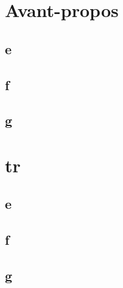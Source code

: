 \documentclass[a4paper,french,final]{memoir}
\begin{document}
\begin{titlingpage}
\hypersetup{pageanchor=false}

\end{titlingpage}
\frontmatter
\tableofcontents
\mainmatter
\chapter{Avant-propos}
\section{e}
\section{f}
\section{g}
\appendix
\appendixpage
\chapter{tr}
\section{e}
\section{f}
\section{g}
\backmatter
\nocite{*}
\printbibliography%
\end{document}
